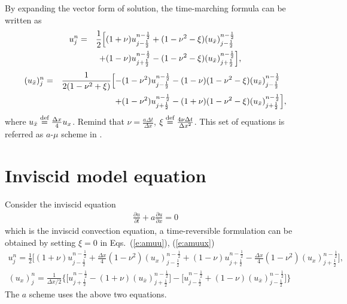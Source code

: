 \documentclass[11pt,dvips]{article}
\numberwithin{equation}{section}
\newcommand{\defeq}{\ensuremath{\buildrel {\text{def}}\over{=}}}
\begin{document}
By expanding the vector form of solution, the time-marching formula can be
written as
\begin{alignat}{2}
  u_j^n &= &\frac{1}{2}\Big[
    &(1+\nu)u_{j-\frac{1}{2}}^{n-\frac{1}{2}}
    + (1-\nu^2-\xi)(u_{\bar{x}})_{j-\frac{1}{2}}^{n-\frac{1}{2}}
    \notag \\
  &&+ &(1-\nu)u_{j+\frac{1}{2}}^{n-\frac{1}{2}}
    - (1-\nu^2-\xi)(u_{\bar{x}})_{j+\frac{1}{2}}^{n-\frac{1}{2}}
           \Big] \label{e:amuu},
\end{alignat}
\begin{alignat}{2}
  (u_{\bar{x}})_j^n &= &\frac{1}{2(1-\nu^2+\xi)}\Big[
    -& (1-\nu^2)u_{j-\frac{1}{2}}^{n-\frac{1}{2}}
    -  (1-\nu)(1-\nu^2-\xi)(u_{\bar{x}})_{j-\frac{1}{2}}^{n-\frac{1}{2}}
    \notag \\
  &&+& (1-\nu^2)u_{j+\frac{1}{2}}^{n-\frac{1}{2}}
    -  (1+\nu)(1-\nu^2-\xi)(u_{\bar{x}})_{j+\frac{1}{2}}^{n-\frac{1}{2}}
                       \Big] \label{e:amuux},
\end{alignat}
where $u_{\bar{x}} \defeq \frac{\Delta x}{4}u_x$.  Remind that $\nu =
\frac{a\Delta t}{\Delta x}$, $\xi \defeq \frac{4\nu\Delta t}{\Delta x^2}$.
This set of equations is referred as $a$-$\mu$ scheme in
\citep{chang_method_1995}.

\section{Inviscid model equation}
\label{s:inviscid_model}

Consider the inviscid equation
\begin{align}
  \frac{\partial u}{\partial t} + a\frac{\partial u}{\partial x} = 0
  \label{e:conv_govern}
\end{align}
which is the inviscid convection equation, a time-reversible formulation can be
obtained by setting $\xi=0$ in Eqs.~(\ref{e:amuu}), (\ref{e:amuux})
\begin{gather}
  u_j^n = \frac{1}{2}\Big[
      (1+\nu)u_{j-\frac{1}{2}}^{n-\frac{1}{2}}
    + \frac{\Delta x}{4}(1-\nu^2)(u_x)_{j-\frac{1}{2}}^{n-\frac{1}{2}}
    + (1-\nu)u_{j+\frac{1}{2}}^{n-\frac{1}{2}}
    - \frac{\Delta x}{4}(1-\nu^2)(u_x)_{j+\frac{1}{2}}^{n-\frac{1}{2}}
  \Big], \label{e:au} \\
  (u_x)_j^n = \frac{1}{\Delta x/2}\Big\{
      \Big[ u_{j+\frac{1}{2}}^{n-\frac{1}{2}}
         - (1+\nu)(u_{\bar{x}})_{j+\frac{1}{2}}^{n-\frac{1}{2}} \Big]
    - \Big[ u_{j-\frac{1}{2}}^{n-\frac{1}{2}}
         + (1-\nu)(u_{\bar{x}})_{j-\frac{1}{2}}^{n-\frac{1}{2}} \Big]
  \Big\} \label{e:aux}
\end{gather}
The $a$ scheme uses the above two equations.
\end{document}
